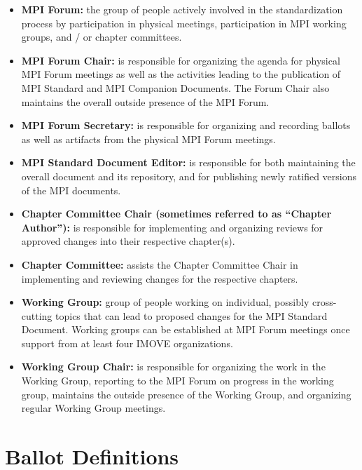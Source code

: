 \begin{itemize}
\item {\bf MPI Forum:} the group of people actively involved in the
  standardization process by participation in physical meetings,
  participation in MPI working groups, and / or chapter committees.
\item {\bf MPI Forum Chair:} is responsible for organizing the agenda
  for physical MPI Forum meetings as well as the activities leading to the
  publication of MPI Standard and MPI Companion Documents. The Forum
  Chair also maintains the overall outside presence of the MPI Forum.
\item {\bf MPI Forum Secretary:} is responsible for organizing and
  recording ballots as well as artifacts from the physical MPI Forum
  meetings.
\item {\bf MPI Standard Document Editor:} is responsible for both
  maintaining the overall document and its repository, and for
  publishing newly ratified versions of the MPI documents.
\item {\bf Chapter Committee Chair (sometimes referred to as ``Chapter
  Author''):} is responsible for implementing and organizing reviews
  for approved changes into their respective chapter(s).
\item {\bf Chapter Committee:} assists the Chapter Committee Chair in
  implementing and reviewing changes for the respective chapters.
\item {\bf Working Group:} group of people working on individual,
  possibly cross-cutting topics that can lead to proposed changes for
  the MPI Standard Document. Working groups can be established at MPI
  Forum meetings once support from at least four IMOVE organizations.
\item {\bf Working Group Chair:} is responsible for organizing the
  work in the Working Group, reporting to the MPI Forum on progress in
  the working group, maintains the outside presence of the Working
  Group, and organizing regular Working Group meetings.
\end{itemize}

\section{Ballot Definitions}

